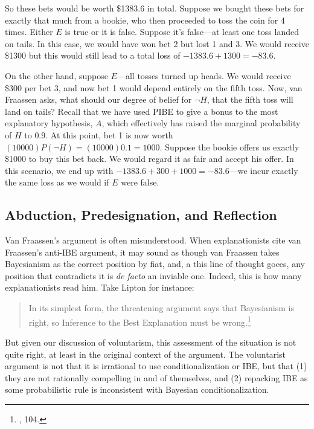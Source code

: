 So these bets would be worth \$1383.6 in total. Suppose we bought these
bets for exactly that much from a bookie, who then proceeded to toss the
coin for 4 times. Either \(E\) is true or it is false. Suppose it's
false---at least one toss landed on tails. In this case, we would have
won bet 2 but lost 1 and 3. We would receive \$1300 but this would still
lead to a total loss of \(-1383.6+1300=-83.6\).

On the other hand, suppose \(E\)---all tosses turned up heads. We would
receive \$300 per bet 3, and now bet 1 would depend entirely on the
fifth toss. Now, van Fraassen asks, what should our degree of belief for
\(\neg H\), that the fifth toss will land on tails? Recall that we have
used PIBE to give a bonus to the most explanatory hypothesis, \(A\),
which effectively has raised the marginal probability of \(H\) to
\(0.9\). At this point, bet 1 is now worth
\((10000)P(\neg H) = (10000)0.1 = 1000\). Suppose the bookie offers us
exactly \$1000 to buy this bet back. We would regard it as fair and
accept his offer. In this scenario, we end up with
\(-1383.6+300+1000 = -83.6\)---we incur exactly the same loss as we
would if \(E\) were false.

\hypertarget{abduction-predesignation-and-reflection}{%
\subsection{Abduction, Predesignation, and
Reflection}\label{abduction-predesignation-and-reflection}}

Van Fraassen's argument is often misunderstood. When explanationists
cite van Fraassen's anti-IBE argument, it may sound as though van
Fraassen takes Bayesianism as the correct position by fiat, and, a this line of thought goees, any position that contradicts it is \emph{de facto} an inviable one. Indeed,
this is how many explanationists read him. Take Lipton for instance:

\begin{quote}
In its simplest form, the threatening argument says that Bayesianism is
right, so Inference to the Best Explanation must be wrong.\footnote{\cite{lipton}, 104.}
\end{quote}

But given our discussion of voluntarism, this assessment of the
situation is not quite right, at least in the original context of the
argument. The voluntarist argument is not that it is irrational to use
conditionalization or IBE, but that (1) they are not rationally
compelling in and of themselves, and (2) repacking IBE as some
probabilistic rule is inconsistent with Bayesian conditionalization.

